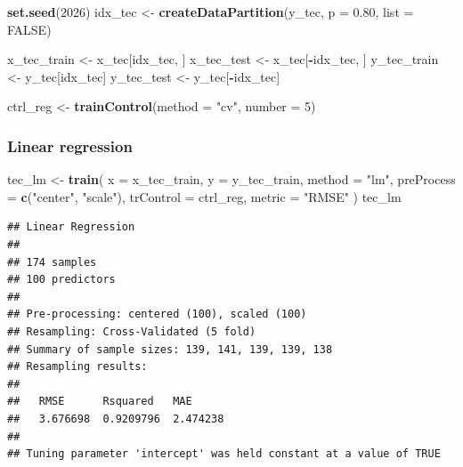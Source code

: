 \documentclass[
  11pt,
]{article}
\newenvironment{Shaded}{\begin{snugshade}}{\end{snugshade}}
\newcommand{\AttributeTok}[1]{\textcolor[rgb]{0.13,0.29,0.53}{#1}}
\newcommand{\ConstantTok}[1]{\textcolor[rgb]{0.56,0.35,0.01}{#1}}
\newcommand{\DecValTok}[1]{\textcolor[rgb]{0.00,0.00,0.81}{#1}}
\newcommand{\FloatTok}[1]{\textcolor[rgb]{0.00,0.00,0.81}{#1}}
\newcommand{\FunctionTok}[1]{\textcolor[rgb]{0.13,0.29,0.53}{\textbf{#1}}}
\newcommand{\NormalTok}[1]{#1}
\newcommand{\OtherTok}[1]{\textcolor[rgb]{0.56,0.35,0.01}{#1}}
\newcommand{\SpecialCharTok}[1]{\textcolor[rgb]{0.81,0.36,0.00}{\textbf{#1}}}
\newcommand{\StringTok}[1]{\textcolor[rgb]{0.31,0.60,0.02}{#1}}
\begin{document}
\begin{Shaded}
\begin{Highlighting}[]
\FunctionTok{set.seed}\NormalTok{(}\DecValTok{2026}\NormalTok{)}
\NormalTok{idx\_tec }\OtherTok{\textless{}{-}} \FunctionTok{createDataPartition}\NormalTok{(y\_tec, }\AttributeTok{p =} \FloatTok{0.80}\NormalTok{, }\AttributeTok{list =} \ConstantTok{FALSE}\NormalTok{)}

\NormalTok{x\_tec\_train }\OtherTok{\textless{}{-}}\NormalTok{ x\_tec[idx\_tec, ]}
\NormalTok{x\_tec\_test  }\OtherTok{\textless{}{-}}\NormalTok{ x\_tec[}\SpecialCharTok{{-}}\NormalTok{idx\_tec, ]}
\NormalTok{y\_tec\_train }\OtherTok{\textless{}{-}}\NormalTok{ y\_tec[idx\_tec]}
\NormalTok{y\_tec\_test  }\OtherTok{\textless{}{-}}\NormalTok{ y\_tec[}\SpecialCharTok{{-}}\NormalTok{idx\_tec]}

\NormalTok{ctrl\_reg }\OtherTok{\textless{}{-}} \FunctionTok{trainControl}\NormalTok{(}\AttributeTok{method =} \StringTok{"cv"}\NormalTok{, }\AttributeTok{number =} \DecValTok{5}\NormalTok{)}
\end{Highlighting}
\end{Shaded}

\subsubsection{Linear regression}\label{linear-regression}

\begin{Shaded}
\begin{Highlighting}[]
\NormalTok{tec\_lm }\OtherTok{\textless{}{-}} \FunctionTok{train}\NormalTok{(}
  \AttributeTok{x =}\NormalTok{ x\_tec\_train,}
  \AttributeTok{y =}\NormalTok{ y\_tec\_train,}
  \AttributeTok{method =} \StringTok{"lm"}\NormalTok{,}
  \AttributeTok{preProcess =} \FunctionTok{c}\NormalTok{(}\StringTok{"center"}\NormalTok{, }\StringTok{"scale"}\NormalTok{),}
  \AttributeTok{trControl =}\NormalTok{ ctrl\_reg,}
  \AttributeTok{metric =} \StringTok{"RMSE"}
\NormalTok{)}
\NormalTok{tec\_lm}
\end{Highlighting}
\end{Shaded}

\begin{verbatim}
## Linear Regression 
## 
## 174 samples
## 100 predictors
## 
## Pre-processing: centered (100), scaled (100) 
## Resampling: Cross-Validated (5 fold) 
## Summary of sample sizes: 139, 141, 139, 139, 138 
## Resampling results:
## 
##   RMSE      Rsquared   MAE     
##   3.676698  0.9209796  2.474238
## 
## Tuning parameter 'intercept' was held constant at a value of TRUE
\end{verbatim}
\end{document}
